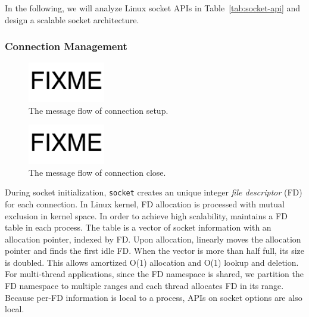 In the following, we will analyze Linux socket APIs in Table~\ref{tab:socket-api} and design a scalable socket architecture.

\subsubsection{Connection Management}
\label{subsubsec:connection_management}

\begin{figure}[t]
	\centering
	\includegraphics[width=0.3\textwidth]{images/fixme}
	\caption{The message flow of connection setup.}
	\label{fig:conn-setup}
\end{figure}

\begin{figure}[t]
	\centering
	\includegraphics[width=0.3\textwidth]{images/fixme}
	\caption{The message flow of connection close.}
	\label{fig:conn-close}
\end{figure}

During socket initialization, \texttt{socket} creates an unique integer \textit{file descriptor} (FD) for each connection. In Linux kernel, FD allocation is processed with mutual exclusion in kernel space. In order to achieve high scalability, \libipc{} maintains a FD table in each process. The table is a vector of socket information with an allocation pointer, indexed by FD. Upon allocation, \libipc{} linearly moves the allocation pointer and finds the first idle FD. When the vector is more than half full, its size is doubled. This allows amortized O(1) allocation and O(1) lookup and deletion. 
For multi-thread applications, since the FD namespace is shared, we partition the FD namespace to multiple ranges and each thread allocates FD in its range.
Because per-FD information is local to a process, APIs on socket options are also local.

